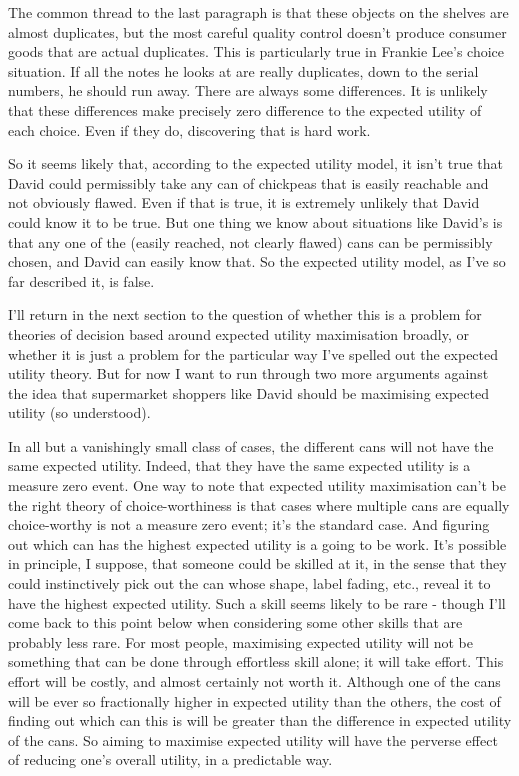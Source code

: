 \documentclass[
  10pt,
  letterpaper,
  twoside]{scrbook}
\begin{document}
The common thread to the last paragraph is that these objects on the
shelves are almost duplicates, but the most careful quality control
doesn't produce consumer goods that are actual duplicates. This is
particularly true in Frankie Lee's choice situation. If all the notes he
looks at are really duplicates, down to the serial numbers, he should
run away. There are always some differences. It is unlikely that these
differences make precisely zero difference to the expected utility of
each choice. Even if they do, discovering that is hard work.

So it seems likely that, according to the expected utility model, it
isn't true that David could permissibly take any can of chickpeas that
is easily reachable and not obviously flawed. Even if that is true, it
is extremely unlikely that David could know it to be true. But one thing
we know about situations like David's is that any one of the (easily
reached, not clearly flawed) cans can be permissibly chosen, and David
can easily know that. So the expected utility model, as I've so far
described it, is false.

I'll return in the next section to the question of whether this is a
problem for theories of decision based around expected utility
maximisation broadly, or whether it is just a problem for the particular
way I've spelled out the expected utility theory. But for now I want to
run through two more arguments against the idea that supermarket
shoppers like David should be maximising expected utility (so
understood).

In all but a vanishingly small class of cases, the different cans will
not have the same expected utility. Indeed, that they have the same
expected utility is a measure zero event. One way to note that expected
utility maximisation can't be the right theory of choice-worthiness is
that cases where multiple cans are equally choice-worthy is not a
measure zero event; it's the standard case. And figuring out which can
has the highest expected utility is a going to be work. It's possible in
principle, I suppose, that someone could be skilled at it, in the sense
that they could instinctively pick out the can whose shape, label
fading, etc., reveal it to have the highest expected utility. Such a
skill seems likely to be rare - though I'll come back to this point
below when considering some other skills that are probably less rare.
For most people, maximising expected utility will not be something that
can be done through effortless skill alone; it will take effort. This
effort will be costly, and almost certainly not worth it. Although one
of the cans will be ever so fractionally higher in expected utility than
the others, the cost of finding out which can this is will be greater
than the difference in expected utility of the cans. So aiming to
maximise expected utility will have the perverse effect of reducing
one's overall utility, in a predictable way.
\end{document}
